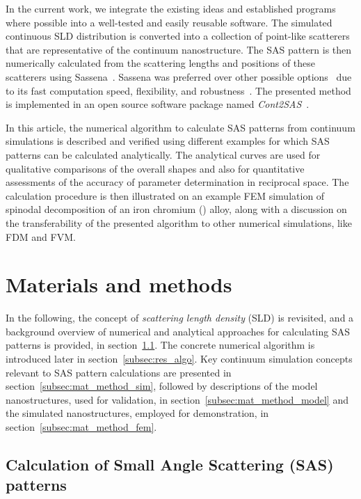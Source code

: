 \documentclass[preprint, 5p, times, twocolumn]{elsarticle}
\begin{document}
In the current work, we integrate the existing ideas and established programs where possible into a well-tested and easily reusable software. The simulated continuous SLD distribution is converted into a collection of point-like scatterers that are representative of the continuum nanostructure. The SAS pattern is then numerically calculated from the scattering lengths and positions of these scatterers using Sassena~\cite{lindner2012sassena, sassena}. Sassena was preferred over other possible options~\cite{walter2018liquidlib, goret2017mdanse, mdanse} due to its fast computation speed, flexibility, and robustness~\cite{reich2022comparison, majumdar2024computation}. The presented method is implemented in an open source software package named \emph{Cont2SAS}~\cite{cont2sas}.

In this article, the numerical algorithm to calculate SAS patterns from continuum simulations is described and verified using different examples for which SAS patterns can be calculated analytically. The analytical curves are used for qualitative comparisons of the overall shapes and also for quantitative assessments of the accuracy of parameter determination in reciprocal space. The calculation procedure is then illustrated on an example FEM simulation of spinodal decomposition of an iron chromium () alloy, along with a discussion on the transferability of the presented algorithm to other numerical simulations, like FDM and FVM.

\section{Materials and methods}
\label{sec:mat_method}

In the following, the concept of \emph{scattering length density} (SLD) is revisited, and a background overview of numerical and analytical approaches for calculating SAS patterns is provided, in section~\ref{subsec:mat_method_sas}. The concrete numerical algorithm is introduced later in section~\ref{subsec:res_algo}. Key continuum simulation concepts relevant to SAS pattern calculations are presented in section~\ref{subsec:mat_method_sim}, followed by descriptions of the model nanostructures, used for validation, in section~\ref{subsec:mat_method_model} and the simulated nanostructures, employed for demonstration, in section~\ref{subsec:mat_method_fem}.

\subsection{Calculation of Small Angle Scattering (SAS) patterns}
\label{subsec:mat_method_sas}
\end{document}
